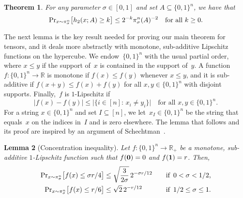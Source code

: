 \documentclass[10pt]{article}
\newtheorem{theorem}{Theorem}[section]
\newtheorem{lemma}[theorem]{Lemma}
\renewcommand{\Pr}{\mbox{\rm Pr}}
\newcommand{\R}{\mathbb{R}}
\newcommand{\bset}[1]{\{0,1\}^{#1}}
\newcommand{\1}{\mathbf{1}}
\newcommand{\st}{:\,}
\newcommand{\beqn}{\begin{equation*}}
\newcommand{\eeqn}{\end{equation*}}
\begin{document}
\begin{theorem}\label{thm:Talagrand}
For any parameter $\sigma\in [0,1]$ and set $A \subseteq \bset{n}$, we have that
\beqn
\Pr_{x\sim \pi_\sigma^n}\big[h_2(x; A) \geq k\big] \leq 2^{-k} \pi_\sigma^n(A)^{-2} \quad \text{for all $k\geq 0$.}
\eeqn
\end{theorem}

The next lemma is the key result needed for proving our main theorem for tensors, and it deals more abstractly with monotone, sub-additive Lipschitz functions on the hypercube.
We endow~$\bset{n}$ with the usual partial order, where $x\leq y$ if the support of~$x$ is contained in the support of~$y$.
A function $f:\bset{n} \to \R$ is monotone if $f(x) \leq f(y)$ whenever $x\leq y$, and it is sub-additive if $f(x+y) \leq f(x) + f(y)$ for all $x,y\in\bset{n}$ with  disjoint supports.
Finally,~$f$ is $1$-Lipschitz if
\beqn
\big|f(x) - f(y)\big| \leq \big|\big\{i \in [n] \st x_i \neq y_i\big\}\big| \quad \text{for all $x, y \in \bset{n}$}.
\eeqn
For a string $x\in \bset{n}$ and set $I\subseteq[n]$, we let~$x_I\in \bset{n}$ be the string that equals~$x$ on the indices in~$I$ and is zero elsewhere.
The lemma that follows and its proof are inspired by an argument of Schechtman~\cite[Corollary~12]{Schechtman2003}.

\begin{lemma}[Concentration inequality] \label{lem:subadditive}
Let $f:\bset{n} \to \R_+$ be a monotone, sub-additive $1$-Lipschitz function such that $f({\bf 0}) =0$ and $f({\bf 1}) = r$.
Then,
\begin{align*}
    \Pr_{x\sim \pi_{\sigma}^n} \big[f(x) \leq \sigma r/4\big] &\leq \sqrt{\frac{3}{2\sigma}}\, 2^{-\sigma r/12} \quad &\text{if $\,0 < \sigma < 1/2$,} \\
    \Pr_{x\sim \pi_{\sigma}^n} \big[f(x) \leq r/6\big] &\leq \sqrt{2}\, 2^{-r/12} &\text{if $\,1/2 \leq \sigma \leq 1$.}
\end{align*}
\end{lemma}
\end{document}

